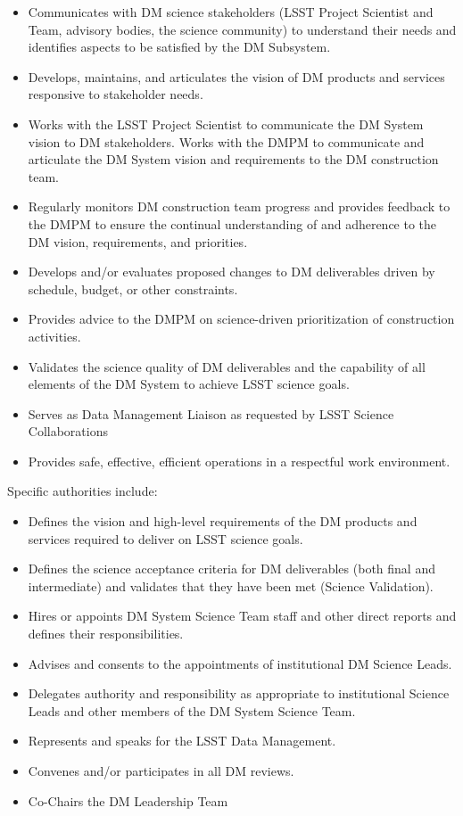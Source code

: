 \begin{itemize}
\item Communicates with \gls{DM} science stakeholders (\gls{LSST} \gls{Project Scientist} and Team, advisory bodies, the science community) to understand their needs and identifies aspects to be satisfied by the \gls{DM} \gls{Subsystem}.
\item Develops, maintains, and articulates the vision of \gls{DM} products and services responsive to stakeholder needs.
\item Works with the \gls{LSST} \gls{Project Scientist} to communicate the \gls{DM} System vision to \gls{DM} stakeholders. Works with the \gls{DMPM} to communicate and articulate the \gls{DM} System vision and requirements to the \gls{DM} construction team.
\item Regularly monitors \gls{DM} construction team progress and provides feedback to the \gls{DMPM} to ensure the continual understanding of and adherence to the \gls{DM} vision, requirements, and priorities.
\item Develops and/or evaluates proposed changes to \gls{DM} deliverables driven by schedule, budget, or other constraints.
\item Provides advice to the \gls{DMPM} on science-driven prioritization of construction activities.
\item Validates the science quality of \gls{DM} deliverables and the capability of all elements of the \gls{DM} System to achieve \gls{LSST} science goals.
\item Serves as \gls{Data Management} Liaison as requested by \gls{LSST} Science Collaborations
\item Provides safe, effective, efficient operations in a respectful work environment.
\end{itemize}

Specific authorities include:

\begin{itemize}
\item Defines the vision and high-level requirements of the \gls{DM} products and services required to deliver on \gls{LSST} science goals.
\item Defines the science acceptance criteria for \gls{DM} deliverables (both final and intermediate) and validates that they have been met (Science \gls{Validation}).
\item Hires or appoints \gls{DM} System Science Team staff and other direct reports and defines their responsibilities.
\item Advises and consents to the appointments of institutional \gls{DM} Science Leads.
\item Delegates authority and responsibility as appropriate to institutional Science Leads and other members of the DM System Science Team.
\item Represents and speaks for the \gls{LSST} \gls{Data Management}.
\item Convenes and/or participates in all \gls{DM} reviews.
\item Co-Chairs the \gls{DM} Leadership Team
\end{itemize}

